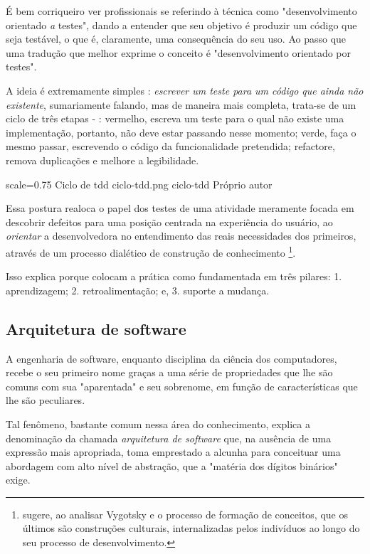     É bem corriqueiro ver profissionais se referindo à  técnica como "desenvolvimento orientado \emph{a} testes", dando a entender que seu objetivo é produzir um código que seja testável, o que é, claramente, uma consequência do seu uso. Ao passo que uma tradução que melhor exprime o conceito é "desenvolvimento orientado {por} testes".

    A ideia é extremamente simples \cite[p.1]{FreemanPryce2009}: \emph{escrever um teste para um código que ainda não existente}, sumariamente falando, mas de maneira mais completa, trata-se de um ciclo de três etapas \cite[pág. x]{Beck2003} - : vermelho,  escreva um teste para o qual não existe uma implementação, portanto, não deve estar passando nesse momento; verde, faça o mesmo passar, escrevendo o código da funcionalidade pretendida; refactore, remova duplicações e melhore a legibilidade.

    \imagem
      {scale=0.75}
      {Ciclo de tdd}
      {ciclo-tdd.png}
      {ciclo-tdd}
      {Próprio autor\footnotemark}

    Essa postura realoca o papel dos testes de uma atividade meramente focada em descobrir defeitos para uma posição centrada na experiência do usuário, ao \emph{orientar} a desenvolvedora no entendimento das reais necessidades dos primeiros, através de um processo dialético de construção de conhecimento \footnote{ sugere, ao analisar Vygotsky e o processo de formação de conceitos, que os últimos são construções culturais, internalizadas pelos indivíduos ao longo do seu processo de desenvolvimento.}.

    Isso explica porque  colocam a prática como fundamentada em três pilares: 1. aprendizagem; 2. retroalimentação; e, 3. suporte a mudança.

  \subsection{Arquitetura de software}

    A engenharia de software, enquanto disciplina da ciência dos computadores, recebe o seu primeiro nome graças a uma série de propriedades que lhe são comuns com sua "aparentada" e seu sobrenome, em função de características que lhe são peculiares.

    Tal fenômeno, bastante comum nessa área do conhecimento, explica a denominação da chamada \emph{arquitetura de software} que, na ausência de uma expressão mais apropriada, toma emprestado a alcunha para conceituar uma abordagem com alto nível de abstração, que a "matéria dos dígitos binários" exige.

